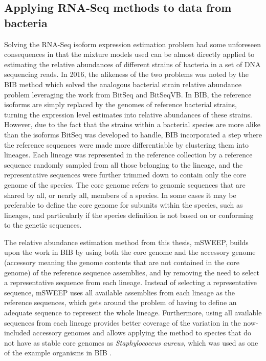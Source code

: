 \documentclass[officiallayout]{tktla}
\begin{document}
\subsection{Applying RNA-Seq methods to data from bacteria}

Solving the RNA-Seq isoform expression estimation problem had some
unforeseen consequences in that the mixture models used can be almost
directly applied to estimating the relative abundances of different
strains of bacteria in a set of DNA sequencing reads. In 2016, the
alikeness of the two problems was noted by the BIB method
\citep{sankar2016bayesian} which solved the analogous bacterial strain
relative abundance problem leveraging the work from BitSeq and
BitSeqVB. In BIB, the reference isoforms are simply replaced by the
genomes of reference bacterial strains, turning the expression level
estimates into relative abundances of these strains. However, due to
the fact that the strains within a bacterial species are more alike
than the isoforms BitSeq was developed to handle, BIB incorporated a
step where the reference sequences were made more differentiable by
clustering them into lineages. Each lineage was represented in the
reference collection by a reference sequence randomly sampled from all
those belonging to the lineage, and the representative sequences were
further trimmed down to contain only the core genome of the
species. The core genome refers to genomic sequences that are shared
by all, or nearly all, members of a species. In some cases it may be
preferable to define the core genome for subunits within the species,
such as lineages, and particularly if the species definition is not
based on or conforming to the genetic sequences.

The relative abundance estimation method from this thesis, mSWEEP,
builds upon the work in BIB by using both the core genome and the
accessory genome (accessory meaning the genome contents that are not
contained in the core genome) of the reference sequence assemblies,
and by removing the need to select a representative sequence from each
lineage. Instead of selecting a representative sequence, mSWEEP uses
all available assemblies from each lineage as the reference sequences,
which gets around the problem of having to define an adequate sequence
to represent the whole lineage. Furthermore, using all available
sequences from each lineage provides better coverage of the variation
in the now-included accessory genomes and allows applying the method
to species that do not have as stable core genomes as
\textit{Staphylococcus aureus}, which was used as one of the example
organisms in BIB \citep{sankar2016bayesian}.
\end{document}
